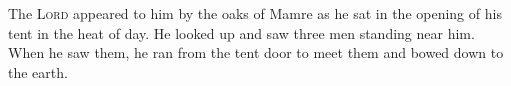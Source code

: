 
\begin{inparaenum}
     The \textsc{Lord} appeared to him by the oaks of Mamre as he sat in the opening of his tent in the heat of day.%
     He looked up and saw three men standing near him. When he saw them, he ran from the tent door to meet them and bowed down to the earth.%
\end{inparaenum}
